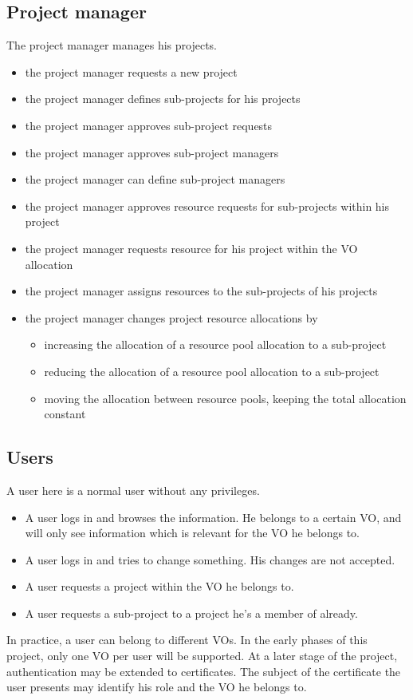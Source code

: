 \documentclass[12pt]{article}
\begin{document}
\subsection{Project manager}
The project manager manages his projects. 
\begin{itemize}
\item the project manager requests a new project 
\item the project manager defines sub-projects for his projects
\item the project manager approves sub-project requests 
\item the project manager approves sub-project managers
\item the project manager can define sub-project managers 
\item the project manager approves resource requests for sub-projects within his project
\item the project manager requests resource for his project within the VO allocation
\item the project manager assigns resources to the sub-projects of his projects
\item the project manager changes project resource allocations by 
  \begin{itemize}
    \item increasing the allocation of a resource pool allocation to a sub-project
    \item reducing the allocation  of a resource pool allocation to a sub-project
    \item moving the allocation between resource pools, keeping the total allocation constant
  \end{itemize}
\end{itemize}

\subsection{Users}
A user here is a normal user without any privileges. 
\begin{itemize}
\item A user logs in and browses the information. He belongs to a certain VO, 
and will only see information which is relevant for the VO he belongs to.
\item A user logs in and tries to change something. His changes are not accepted.  
\item A user requests a project within the VO he belongs to.
\item A user requests a sub-project to a project he's a member of already.
\end{itemize}
In practice, a user can belong to different VOs. In the early phases of this project, only one VO per user will be supported. At a later stage of the project, authentication may be extended to certificates. The subject of the certificate the user presents may identify his role and the VO he belongs to.
\end{document}
